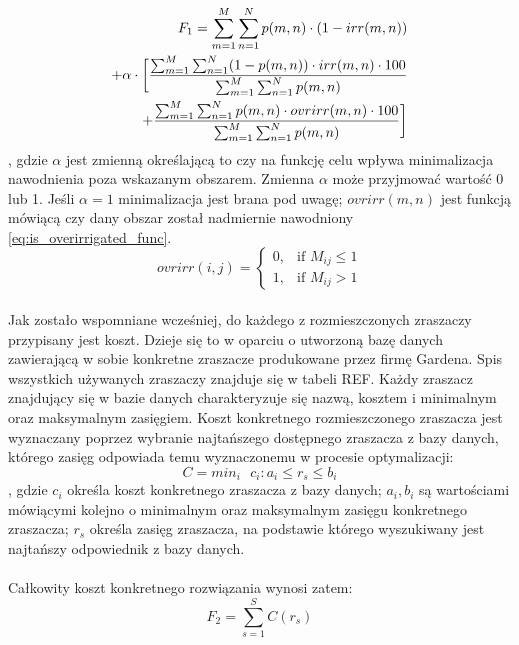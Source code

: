 \documentclass[twoside]{iisthesis}
\begin{document}
\begin{equation}
\begin{split}
	F_{1} = \sum_{m=1}^{M}\sum_{n=1}^{N} p(m,n) \cdot (1 - irr(m,n)) \\ + 
	\alpha \cdot \bigg{[}\dfrac{\sum_{m=1}^{M}\sum_{n=1}^{N} (1 - p(m,n)) \cdot irr(m,n) \cdot 100}{\sum_{m=1}^{M}\sum_{n=1}^{N} p(m,n)} \\ + \dfrac{\sum_{m=1}^{M}\sum_{n=1}^{N} p(m,n) \cdot ovrirr(m,n) \cdot 100}{\sum_{m=1}^{M}\sum_{n=1}^{N} p(m,n)}\bigg{]}
\end{split}
\end{equation}
, gdzie $\alpha$ jest zmienną określającą to czy na funkcję celu wpływa minimalizacja nawodnienia poza wskazanym obszarem. Zmienna $\alpha$ może przyjmować wartość 0 lub 1. Jeśli $\alpha=1$ minimalizacja jest brana pod uwagę; $ovrirr(m,n)$ jest funkcją mówiącą czy dany obszar został nadmiernie nawodniony \eqref{eq:is_overirrigated_func}.
\begin{equation}\label{eq:is_overirrigated_func}
	ovrirr(i,j) = \begin{cases}
				0,& \text{if } M_{ij} \leq 1 \\
				1,& \text{if } M_{ij} > 1
			   \end{cases}
\end{equation}
\\Jak zostało wspomniane wcześniej, do każdego z rozmieszczonych zraszaczy przypisany jest koszt. Dzieje się to w oparciu o utworzoną bazę danych zawierającą w sobie konkretne zraszacze produkowane przez firmę Gardena. Spis wszystkich używanych zraszaczy znajduje się w tabeli REF. Każdy zraszacz znajdujący się w bazie danych charakteryzuje się nazwą, kosztem i minimalnym oraz maksymalnym zasięgiem. Koszt konkretnego rozmieszczonego zraszacza jest wyznaczany poprzez wybranie najtańszego dostępnego zraszacza z bazy danych, którego zasięg odpowiada temu wyznaczonemu w procesie optymalizacji:
\begin{equation}
	C = min_{i}\text{ }c_{i} : a_{i} \leq r_{s} \leq b_{i}
\end{equation}
, gdzie $c_{i}$ określa koszt konkretnego zraszacza z bazy danych; $a_{i}, b_{i}$ są wartościami mówiącymi kolejno o minimalnym oraz maksymalnym zasięgu konkretnego zraszacza; $r_{s}$ określa zasięg zraszacza, na podstawie którego wyszukiwany jest najtańszy odpowiednik z bazy danych.\\\\
Całkowity koszt konkretnego rozwiązania wynosi zatem:
\begin{equation}
	F_{2} = \sum_{s=1}^{S} C(r_{s})
\end{equation}
\end{document}
